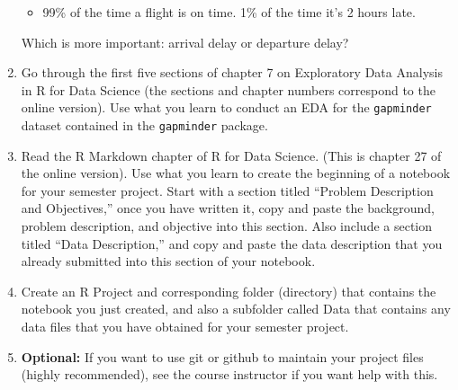 \documentclass[12pt]{article}
\begin{document}
\begin{enumerate}
\begin{itemize}
          \item 99\% of the time a flight is on time. 1\% of the time it's 2 hours late.
       \end{itemize}
Which is more important: arrival delay or departure delay? 
\item Go through the first five sections of chapter 7 on Exploratory Data Analysis in R for Data Science (the sections and chapter numbers correspond to the online version). Use what you learn to conduct an EDA for the {\tt gapminder} dataset contained in the {\tt gapminder} package.   
\item Read the R Markdown chapter of R for Data Science. (This is chapter 27 of the online version). Use what you learn to create the beginning of a notebook for your semester project. Start with a section titled ``Problem Description and Objectives,'' once you have written it, copy and paste the  background, problem description, and objective into this section. Also include a section titled ``Data Description,'' and copy and paste the data description that you already submitted into this section of your notebook.  
\item Create an R Project and corresponding folder (directory) that contains the notebook you just created, and also a subfolder called Data that contains any data files that you have obtained for your semester project.  
\item {\bf Optional:} If you want to use git or github to maintain your project files (highly recommended), see the course instructor if you want help with this.   
  \end{enumerate}
\end{document}
